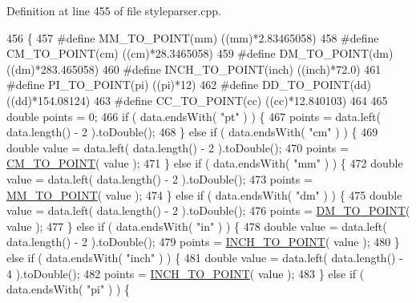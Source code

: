 Definition at line 455 of file styleparser.\+cpp.


\begin{DoxyCode}
456 \{
457 \textcolor{preprocessor}{  #define MM\_TO\_POINT(mm) ((mm)*2.83465058)}
458 \textcolor{preprocessor}{  #define CM\_TO\_POINT(cm) ((cm)*28.3465058)}
459 \textcolor{preprocessor}{  #define DM\_TO\_POINT(dm) ((dm)*283.465058)}
460 \textcolor{preprocessor}{  #define INCH\_TO\_POINT(inch) ((inch)*72.0)}
461 \textcolor{preprocessor}{  #define PI\_TO\_POINT(pi) ((pi)*12)}
462 \textcolor{preprocessor}{  #define DD\_TO\_POINT(dd) ((dd)*154.08124)}
463 \textcolor{preprocessor}{  #define CC\_TO\_POINT(cc) ((cc)*12.840103)}
464 
465   \textcolor{keywordtype}{double} points = 0;
466   \textcolor{keywordflow}{if} ( data.endsWith( \textcolor{stringliteral}{"pt"} ) ) \{
467     points = data.left( data.length() - 2 ).toDouble();
468   \} \textcolor{keywordflow}{else} \textcolor{keywordflow}{if} ( data.endsWith( \textcolor{stringliteral}{"cm"} ) ) \{
469     \textcolor{keywordtype}{double} value = data.left( data.length() - 2 ).toDouble();
470     points = \hyperlink{styleparser_8cpp_a37faf85021b6cab0edaa1087e8c5280e}{CM\_TO\_POINT}( value );
471   \} \textcolor{keywordflow}{else} \textcolor{keywordflow}{if} ( data.endsWith( \textcolor{stringliteral}{"mm"} ) ) \{
472     \textcolor{keywordtype}{double} value = data.left( data.length() - 2 ).toDouble();
473     points = \hyperlink{styleparser_8cpp_a85f198d69e42a5686c905514be5c5137}{MM\_TO\_POINT}( value );
474   \} \textcolor{keywordflow}{else} \textcolor{keywordflow}{if} ( data.endsWith( \textcolor{stringliteral}{"dm"} ) ) \{
475     \textcolor{keywordtype}{double} value = data.left( data.length() - 2 ).toDouble();
476     points = \hyperlink{styleparser_8cpp_aec1021756b3b02af73eab35246b78e5f}{DM\_TO\_POINT}( value );
477   \} \textcolor{keywordflow}{else} \textcolor{keywordflow}{if} ( data.endsWith( \textcolor{stringliteral}{"in"} ) ) \{
478     \textcolor{keywordtype}{double} value = data.left( data.length() - 2 ).toDouble();
479     points = \hyperlink{styleparser_8cpp_aa8de65e1e8bd2a5dffd7045030eb24da}{INCH\_TO\_POINT}( value );
480   \} \textcolor{keywordflow}{else} \textcolor{keywordflow}{if} ( data.endsWith( \textcolor{stringliteral}{"inch"} ) ) \{
481     \textcolor{keywordtype}{double} value = data.left( data.length() - 4 ).toDouble();
482     points = \hyperlink{styleparser_8cpp_aa8de65e1e8bd2a5dffd7045030eb24da}{INCH\_TO\_POINT}( value );
483   \} \textcolor{keywordflow}{else} \textcolor{keywordflow}{if} ( data.endsWith( \textcolor{stringliteral}{"pi"} ) ) \{

\end{DoxyCode}
